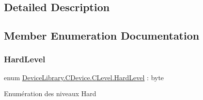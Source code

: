 \subsection{Detailed Description}




\subsection{Member Enumeration Documentation}
\mbox{\label{class_device_library_1_1_c_device_1_1_c_level_a3f3169da53d5beebdac25e401982101a}} 
\subsubsection{\texorpdfstring{Hard\+Level}{HardLevel}}
{\footnotesize\ttfamily enum \mbox{\hyperlink{class_device_library_1_1_c_device_1_1_c_level_a3f3169da53d5beebdac25e401982101a}{Device\+Library.\+C\+Device.\+C\+Level.\+Hard\+Level}} \+: byte\hspace{0.3cm}{\ttfamily [strong]}}



Enumération des niveaux Hard 

